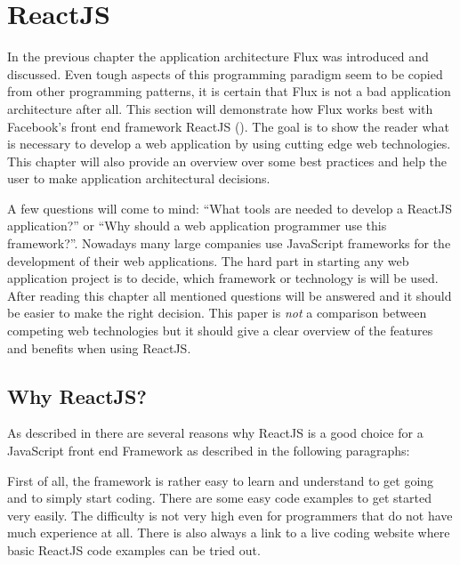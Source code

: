 \chapter{ReactJS}
\label{cha:ReactJS}


In the previous chapter the application architecture Flux was introduced and discussed. Even tough aspects of this programming paradigm seem to be copied from other programming patterns, it is certain that Flux is not a bad application architecture after all. This section will demonstrate how Flux works best with Facebook's front end framework ReactJS (\cite{FacebookInc.2013}). The goal is to show the reader what is necessary to develop a web application by using cutting edge web technologies. This chapter will also provide an overview over some best practices and help the user to make application architectural decisions.

A few questions will come to mind: \enquote{What tools are needed to develop a \mbox{ReactJS} application?} or \enquote{Why should a web application programmer use this framework?}. Nowadays many large companies use JavaScript frameworks for the development of their web applications. The hard part in starting any web application project is to decide, which framework or technology is will be used. After reading this chapter all mentioned questions will be answered and it should be easier to make the right decision. This paper is \emph{not} a comparison between competing web technologies but it should give a clear overview of the features and benefits when using ReactJS.

\section{Why ReactJS?} \label{sec:whyreactjs}

As described in \cite[S.7-8]{Zeigermann.2016} there are several reasons why ReactJS is a good choice for a JavaScript front end Framework as described in the following paragraphs:

First of all, the framework is rather easy to learn and understand to get going and to simply start coding. There are some easy code examples \cite[Docs: Hello World]{FacebookInc.2013} to get started very easily. The difficulty is not very high even for programmers that do not have much experience at all. There is also always a link to a live coding website where basic ReactJS code examples can be tried out.

